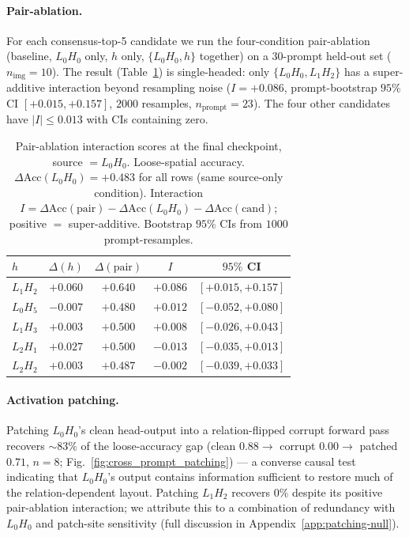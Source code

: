 \documentclass{article}
\theoremstyle{plain}
\theoremstyle{definition}
\begin{document}
\paragraph{Pair-ablation.}
\label{sec:pair-ablation}

For each consensus-top-5 candidate we run the four-condition pair-ablation (baseline, $L_0H_0$ only, $h$ only, $\{L_0H_0, h\}$ together) on a $30$-prompt held-out set ($n_\text{img}{=}10$). The result (Table~\ref{tab:pair-ablation}) is single-headed: only $\{L_0H_0, L_1H_2\}$ has a super-additive interaction beyond resampling noise ($I = +0.086$, prompt-bootstrap $95\%$ CI $[+0.015, +0.157]$, $2000$ resamples, $n_\text{prompt}{=}23$). The four other candidates have $|I| \leq 0.013$ with CIs containing zero.

\begin{table}[t]
\centering
\small
\caption{Pair-ablation interaction scores at the final checkpoint, source $= L_0H_0$. Loose-spatial accuracy. $\Delta\mathrm{Acc}(L_0H_0) = +0.483$ for all rows (same source-only condition). Interaction $I = \Delta\mathrm{Acc}(\text{pair}) - \Delta\mathrm{Acc}(L_0H_0) - \Delta\mathrm{Acc}(\text{cand})$; positive $=$ super-additive. Bootstrap $95\%$ CIs from $1000$ prompt-resamples.}
\label{tab:pair-ablation}
\setlength{\tabcolsep}{3pt}
\begin{tabular}{lcccc}
\toprule
$h$ & $\Delta(h)$ & $\Delta(\text{pair})$ & $I$ & $95\%$ CI \\
\midrule
$L_1H_2$ & $+0.060$ & $+0.640$ & $+0.086$ & $[+0.015, +0.157]$ \\
$L_0H_5$ & $-0.007$ & $+0.480$ & $+0.012$ & $[-0.052, +0.080]$ \\
$L_1H_3$ & $+0.003$ & $+0.500$ & $+0.008$ & $[-0.026, +0.043]$ \\
$L_2H_1$ & $+0.027$ & $+0.500$ & $-0.013$ & $[-0.035, +0.013]$ \\
$L_2H_2$ & $+0.003$ & $+0.487$ & $-0.002$ & $[-0.039, +0.033]$ \\
\bottomrule
\end{tabular}
\end{table}

\paragraph{Activation patching.}
Patching $L_0H_0$'s clean head-output into a relation-flipped corrupt forward pass recovers $\sim\!83\%$ of the loose-accuracy gap (clean $0.88\to$ corrupt $0.00\to$ patched $0.71$, $n{=}8$; Fig.~\ref{fig:cross_prompt_patching}) --- a converse causal test indicating that $L_0H_0$'s output contains information sufficient to restore much of the relation-dependent layout. Patching $L_1H_2$ recovers $0\%$ despite its positive pair-ablation interaction; we attribute this to a combination of redundancy with $L_0H_0$ and patch-site sensitivity (full discussion in Appendix~\ref{app:patching-null}).
\end{document}
